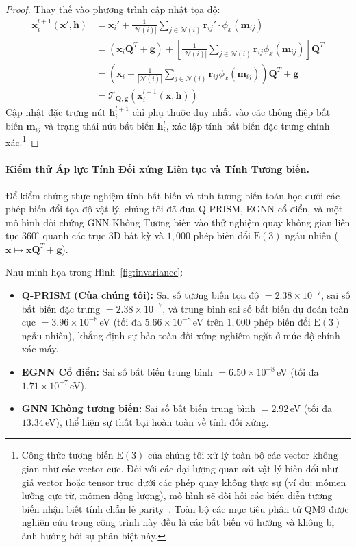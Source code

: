 \documentclass[10pt,twocolumn,letterpaper]{article}
\begin{document}
\begin{proof}
Thay thế vào phương trình cập nhật tọa độ:
\begin{align}
    \mathbf{x}_i^{l+1}(\mathbf{x}', \mathbf{h}) &= \mathbf{x}_i' + \frac{1}{|\mathcal{N}(i)|} \sum_{j \in \mathcal{N}(i)} \mathbf{r}_{ij}' \cdot \phi_x(\mathbf{m}_{ij}) \nonumber \\
    &= (\mathbf{x}_i \mathbf{Q}^T + \mathbf{g}) + \left[\frac{1}{|\mathcal{N}(i)|} \sum_{j \in \mathcal{N}(i)} \mathbf{r}_{ij} \phi_x(\mathbf{m}_{ij})\right] \mathbf{Q}^T \nonumber \\
    &= \left(\mathbf{x}_i + \frac{1}{|\mathcal{N}(i)|} \sum_{j \in \mathcal{N}(i)} \mathbf{r}_{ij} \phi_x(\mathbf{m}_{ij})\right) \mathbf{Q}^T + \mathbf{g} \nonumber \\
    &= \mathcal{T}_{\mathbf{Q}, \mathbf{g}}(\mathbf{x}_i^{l+1}(\mathbf{x}, \mathbf{h}))
\end{align}
Cập nhật đặc trưng nút $\mathbf{h}_i^{l+1}$ chỉ phụ thuộc duy nhất vào các thông điệp bất biến $\mathbf{m}_{ij}$ và trạng thái nút bất biến $\mathbf{h}_i^l$, xác lập tính bất biến đặc trưng chính xác.\footnote{Công thức tương biến $\mathrm{E}(3)$ của chúng tôi xử lý toàn bộ các vector không gian như các vector cực. Đối với các đại lượng quan sát vật lý biến đổi như giả vector hoặc tensor trục dưới các phép quay không thực sự (ví dụ: mômen lưỡng cực từ, mômen động lượng), mô hình sẽ đòi hỏi các biểu diễn tương biến nhận biết tính chẵn lẻ parity~\cite{batatiaMACEHigherOrder2022}. Toàn bộ các mục tiêu phân tử QM9 được nghiên cứu trong công trình này đều là các bất biến vô hướng và không bị ảnh hưởng bởi sự phân biệt này.}
\end{proof}

\paragraph{Kiểm thử Áp lực Tính Đối xứng Liên tục và Tính Tương biến.}
Để kiểm chứng thực nghiệm tính bất biến và tính tương biến toán học dưới các phép biến đổi tọa độ vật lý, chúng tôi đã đưa Q-PRISM, EGNN cổ điển, và một mô hình đối chứng GNN Không Tương biến vào thử nghiệm quay không gian liên tục $360^\circ$ quanh các trục 3D bất kỳ và $1{,}000$ phép biến đổi $\mathrm{E}(3)$ ngẫu nhiên ($\mathbf{x} \mapsto \mathbf{x}\mathbf{Q}^T + \mathbf{g}$).

Như minh họa trong Hình~\ref{fig:invariance}:
\begin{itemize}
    \item \textbf{Q-PRISM (Của chúng tôi):} Sai số tương biến tọa độ $= 2.38 \times 10^{-7}$, sai số bất biến đặc trưng $= 2.38 \times 10^{-7}$, và trung bình sai số bất biến dự đoán toàn cục $= 3.96 \times 10^{-8}$\,eV (tối đa $5.66 \times 10^{-8}$\,eV trên $1{,}000$ phép biến đổi $\mathrm{E}(3)$ ngẫu nhiên), khẳng định sự bảo toàn đối xứng nghiêm ngặt ở mức độ chính xác máy.
    \item \textbf{EGNN Cổ điển:} Sai số bất biến trung bình $= 6.50 \times 10^{-8}$\,eV (tối đa $1.71 \times 10^{-7}$\,eV).
    \item \textbf{GNN Không tương biến:} Sai số bất biến trung bình $= 2.92$\,eV (tối đa $13.34$\,eV), thể hiện sự thất bại hoàn toàn về tính đối xứng.
\end{itemize}
\end{document}
